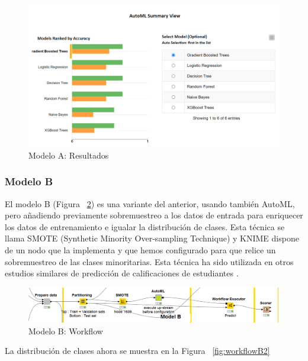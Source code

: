 \begin{figure}[!htb]
	\centering
	\includegraphics[width=1\textwidth]{img/workflowA4.png}
	\caption{Modelo A: Resultados}
	\label{fig:workflowA4}
\end{figure}
\FloatBarrier

\subsubsection{Modelo B}

El modelo B (Figura ~\ref{fig:workflowB1}) es una variante del anterior, usando también AutoML, pero añadiendo previamente sobremuestreo a los datos 
de entrada para enriquecer los datos de entrenamiento e igualar la distribución de clases. Esta técnica se llama 
SMOTE \cite{smote} (Synthetic Minority Over-sampling Technique) y KNIME dispone de un nodo que la implementa y que hemos 
configurado para que relice un sobremuestreo de las clases minoritarias. Esta técnica ha sido utilizada en otros estudios similares de 
predicción de calificaciones de estudiantes \cite{multiclass-pred}. 

\begin{figure}[!htb]
	\centering
	\includegraphics[width=1\textwidth]{img/workflowB1.png}
	\caption{Modelo B: Workflow}
	\label{fig:workflowB1}
\end{figure}
\FloatBarrier

La distribución de clases ahora se muestra en la Figura ~\ref{fig:workflowB2}

